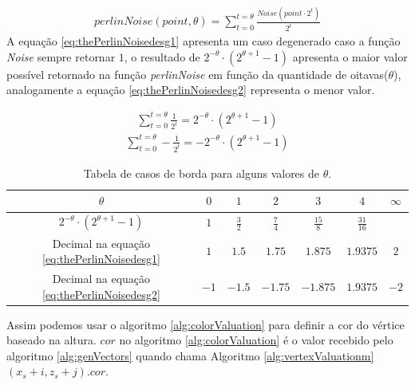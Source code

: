 \begin{equation}\label{eq:thePerlinNoise}
  \begin{split}
    perlinNoise(point, \theta) = \sum_{t=0}^{t=\theta} \frac{Noise(point \cdot 2^{t})}{2^{t}}
  \end{split}
\end{equation}
A equação \ref{eq:thePerlinNoisedesg1} apresenta um caso degenerado caso a função
\textit{Noise} sempre retornar $1$, o resultado de $2^{-\theta} \cdot (2^{\theta +1}-1)$
apresenta o maior valor possível retornado na função \textit{perlinNoise} em função da quantidade 
de oitavas($\theta$), analogamente a equação \ref{eq:thePerlinNoisedesg2} representa o menor valor.
 
\begin{equation}\label{eq:thePerlinNoisedesg1}
  \begin{split}
    \sum_{t=0}^{t=\theta} \frac{1}{2^{t}} = 2^{-\theta} \cdot (2^{\theta +1}-1)
  \end{split}
\end{equation}
\begin{equation}\label{eq:thePerlinNoisedesg2}
  \begin{split}
    \sum_{t=0}^{t=\theta} -\frac{1}{2^{t}} = -2^{-\theta} \cdot (2^{\theta +1}-1)
  \end{split}
\end{equation}

\begin{table}[H]
    \centering
    \caption{Tabela de casos de borda para alguns valores de $\theta$.}
    \label{tab:degenerateNoise}
    \begin{tabular}{| c | c c c c c c|}
        \hline
        $\theta$ & $0$ & $1$ & $2$ & $3$ & $4$ & $\infty$\\
        \hline
        $2^{-\theta} \cdot (2^{\theta +1}-1)$           & $1$  & $\frac{3}{2}$ & $\frac{7}{4}$ & $\frac{15}{8}$    & $\frac{31}{16}$ &   \\
        Decimal na equação \ref{eq:thePerlinNoisedesg1} & $1$  & $1.5$   & $1.75$  & $1.875$ & $1.9375$  & $2$  \\
        Decimal na equação \ref{eq:thePerlinNoisedesg2} & $-1$ & $-1.5$  & $-1.75$ & $-1.875$ & $1.9375$ & $-2$  \\
        \hline
    \end{tabular}
\end{table}

Assim podemos
usar o algoritmo \ref{alg:colorValuation} para definir a cor do vértice baseado na altura.
$cor$ no algoritmo \ref{alg:colorValuation} é o valor recebido pelo algoritmo \ref{alg:genVectors}
quando chama Algoritmo \ref{alg:vertexValuationm}$(x_{s} + i, z_{s} + j).cor$.

